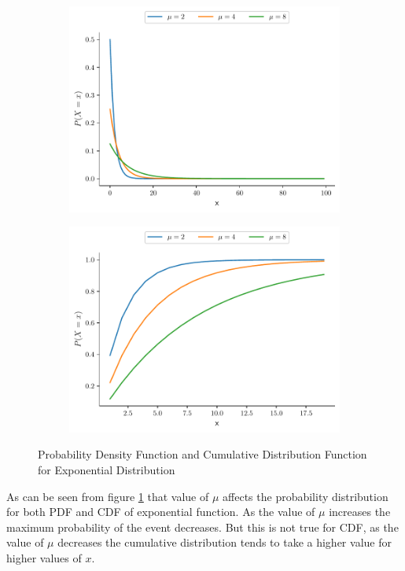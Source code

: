 \documentclass[twoside,12pt]{report}  %
\begin{document}
\vfill
\pagebreak

\begin{figure}[H]
	\centering
	\begin{subfigure}[b]{0.3\textwidth}
		\includegraphics[width=\textwidth]{./images/exponentail_example_mu.pdf}
	\end{subfigure}
	\begin{subfigure}[b]{0.3\textwidth}
		\includegraphics[width=\textwidth]{./images/exponentail_example_cdf_mu.pdf}
	\end{subfigure}
	\caption{Probability Density Function and Cumulative Distribution Function for Exponential Distribution}
	\label{figure_exponentail_example_mu}
\end{figure}
\noindent
As can be seen from figure \ref{figure_exponentail_example_mu} that value of $\mu$ affects the probability distribution for both PDF and CDF of exponential function. As the value of $\mu$ increases the maximum probability of the event decreases. But this is not true for CDF, as the value of $\mu$ decreases the cumulative distribution tends to take a higher value for higher values of $x$.  
\end{document}
